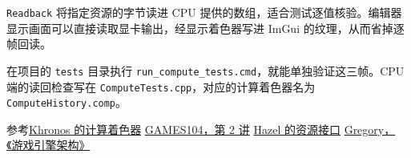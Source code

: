 \texttt{Readback} 将指定资源的字节读进 CPU 提供的数组，适合测试逐值核验。编辑器显示画面可以直接读取显卡输出，经显示着色器写进 ImGui 的纹理，从而省掉逐帧回读。

在项目的 \texttt{tests} 目录执行 \texttt{run\_compute\_tests.cmd}，就能单独验证这三帧。CPU 端的读回检查写在 \texttt{ComputeTests.cpp}，对应的计算着色器名为 \texttt{ComputeHistory.comp}。

{\small 参考\quad\href{https://docs.vulkan.org/tutorial/latest/11_Compute_Shader.html}{Khronos 的计算着色器}\quad
\href{https://games104.boomingtech.com/sc/course-list/}{GAMES104，第 2 讲}\quad
\href{https://github.com/TheCherno/Hazel/blob/master/Hazel/src/Hazel/Renderer/Texture.h}{Hazel 的资源接口}\quad
\href{https://gameenginebook.com/}{Gregory，《游戏引擎架构》}}
